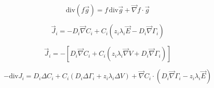 \documentclass[aps,12pt]{revtex4}
\begin{document}
\begin{equation}
	\mathrm{div}(f\vec{g}) = f \, \mathrm{div}\vec{g} + \vec{\nabla} f \cdot \vec{g}
\end{equation}

\begin{equation}
	\vec{J}_i = -D_i \vec{\nabla} C_i + C_i \left( z_i \lambda_i \vec{E} - D_i \vec{\nabla}\Gamma_i \right)
\end{equation}

\begin{equation}
	\vec{J}_i = - \left[ D_i \vec{\nabla} C_i + C_i \left( z_i \lambda_i \vec{\nabla} V + D_i \vec{\nabla}\Gamma_i \right) \right]
\end{equation}

\begin{equation}
	-\mathrm{div} J_i = D_i \Delta C_i + C_i \left( D_i \Delta \Gamma_i + z_i \lambda_i \Delta V \right)
	+ \vec{\nabla} C_i \cdot \left(  D_i \vec{\nabla}\Gamma_i - z_i \lambda_i \vec{E} \right) 
\end{equation}
\end{document}
